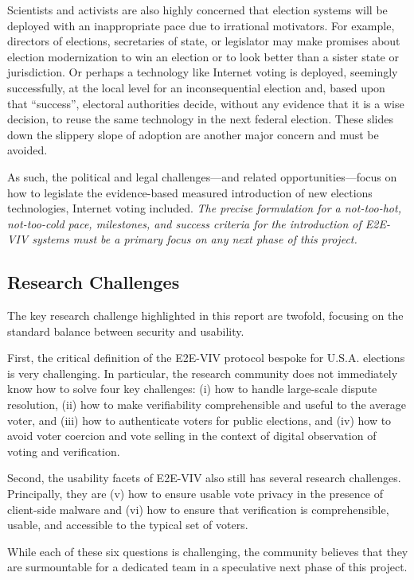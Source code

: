 Scientists and activists are also highly concerned that election
systems will be deployed with an inappropriate pace due to irrational
motivators. For example, directors of elections, secretaries of state,
or legislator may make promises about election modernization to win an
election or to look better than a sister state or jurisdiction. Or
perhaps a technology like Internet voting is deployed, seemingly
successfully, at the local level for an inconsequential election and,
based upon that ``success'', electoral authorities decide, without any
evidence that it is a wise decision, to reuse the same technology in
the next federal election. These slides down the slippery slope of
adoption are another major concern and must be avoided.

As such, the political and legal challenges---and related
opportunities---focus on how to legislate the evidence-based measured
introduction of new elections technologies, Internet voting
included. \emph{The precise formulation for a not-too-hot,
  not-too-cold pace, milestones, and success criteria for the
  introduction of E2E-VIV systems must be a primary focus on any next
  phase of this project.}

\subsection{Research Challenges}

The key research challenge highlighted in this report are twofold,
focusing on the standard balance between security and usability.

First, the critical definition of the E2E-VIV protocol bespoke for
U.S.A. elections is very challenging. In particular, the research
community does not immediately know how to solve four key challenges:
(i) how to handle large-scale dispute resolution, (ii) how to make
verifiability comprehensible and useful to the average voter, and
(iii) how to authenticate voters for public elections, and (iv) how to
avoid voter coercion and vote selling in the context of digital
observation of voting and verification.

Second, the usability facets of E2E-VIV also still has several
research challenges. Principally, they are (v) how to ensure usable vote
privacy in the presence of client-side malware and (vi) how to ensure
that verification is comprehensible, usable, and accessible to the
typical set of voters.

While each of these six questions is challenging, the community
believes that they are surmountable for a dedicated team in a
speculative next phase of this project.

